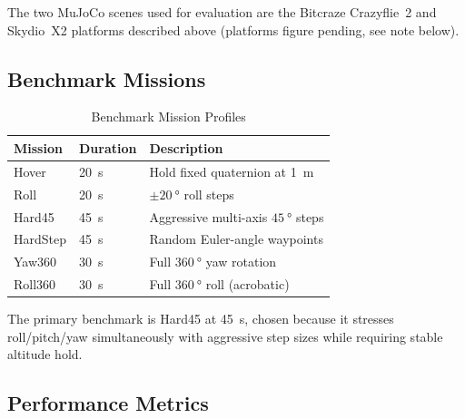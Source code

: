 \documentclass[conference]{IEEEtran}
\begin{document}
The two MuJoCo scenes used for evaluation are the Bitcraze Crazyflie~2 and Skydio~X2 platforms described above (platforms figure pending, see note below).


\subsection{Benchmark Missions}

\begin{table}[t]
  \centering
  \caption{Benchmark Mission Profiles}
  \label{tab:missions}
  \begin{tabular}{lll}
    \toprule
    Mission & Duration & Description \\
    \midrule
    Hover     & \SI{20}{\second}   & Hold fixed quaternion at \SI{1}{\meter} \\
    Roll      & \SI{20}{\second}   & $\pm\SI{20}{\degree}$ roll steps \\
    Hard45    & \SI{45}{\second}   & Aggressive multi-axis $\SI{45}{\degree}$ steps \\
    HardStep  & \SI{45}{\second}   & Random Euler-angle waypoints \\
    Yaw360    & \SI{30}{\second}   & Full $\SI{360}{\degree}$ yaw rotation \\
    Roll360   & \SI{30}{\second}   & Full $\SI{360}{\degree}$ roll (acrobatic) \\
    \bottomrule
  \end{tabular}
\end{table}

The primary benchmark is Hard45 at \SI{45}{\second}, chosen because it
stresses roll/pitch/yaw simultaneously with aggressive step sizes while
requiring stable altitude hold.

\subsection{Performance Metrics}
\end{document}
